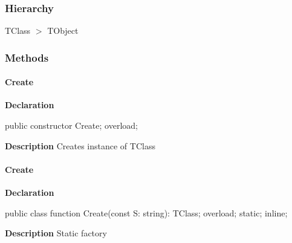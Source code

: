 \documentclass{report}
\newif\ifpdf
\begin{document}
\subsubsection*{\large{\textbf{Hierarchy}}\normalsize\hspace{1ex}\hfill}
TClass {$>$} TObject
\subsubsection*{\large{\textbf{Methods}}\normalsize\hspace{1ex}\hfill}
\paragraph*{Create}\hspace*{\fill}

\label{ok_parse_impl.TClass-Create}
\begin{list}{}{
\setlength{\itemindent}{0cm}
\setlength{\listparindent}{0cm}
\setlength{\leftmargin}{\evensidemargin}
\addtolength{\leftmargin}{\tmplength}
\settowidth{\labelsep}{X}
\addtolength{\leftmargin}{\labelsep}
\setlength{\labelwidth}{\tmplength}
}
\item[\textbf{Declaration}\hfill]
\ifpdf
\begin{flushleft}
\fi
\begin{ttfamily}
public constructor Create; overload;\end{ttfamily}

\ifpdf
\end{flushleft}
\fi

\par
\item[\textbf{Description}]
Creates instance of TClass

\end{list}
\paragraph*{Create}\hspace*{\fill}

\label{ok_parse_impl.TClass-Create}
\begin{list}{}{
\setlength{\itemindent}{0cm}
\setlength{\listparindent}{0cm}
\setlength{\leftmargin}{\evensidemargin}
\addtolength{\leftmargin}{\tmplength}
\settowidth{\labelsep}{X}
\addtolength{\leftmargin}{\labelsep}
\setlength{\labelwidth}{\tmplength}
}
\item[\textbf{Declaration}\hfill]
\ifpdf
\begin{flushleft}
\fi
\begin{ttfamily}
public class function Create(const S: string): TClass; overload; static; inline;\end{ttfamily}

\ifpdf
\end{flushleft}
\fi

\par
\item[\textbf{Description}]
Static factory

\end{list}
\end{document}
